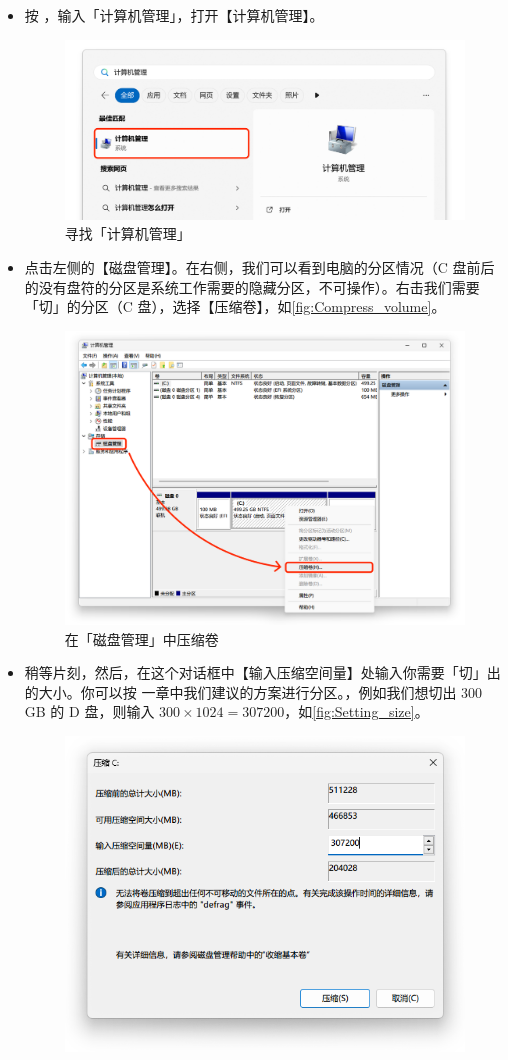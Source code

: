 \begin{itemize}
  \item 按 ，输入「计算机管理」，打开【计算机管理】。
    \begin{figure}[htb!]
      \centering
      \includegraphics[width=.65\textwidth]{assets/appendix/Computer_management.png}
      \caption{寻找「计算机管理」}
      \label{fig:Computer_management}
    \end{figure}
  \item 点击左侧的【磁盘管理】。在右侧，我们可以看到电脑的分区情况（C 盘前后的没有盘符的分区是系统工作需要的隐藏分区，不可操作）。右击我们需要「切」的分区（C 盘），选择【压缩卷】，如\autoref{fig:Compress_volume}。
    \begin{figure}[htb!]
      \centering
      \includegraphics[width=.75\textwidth]{assets/appendix/Compress_volume.png}
      \caption{在「磁盘管理」中压缩卷}
      \label{fig:Compress_volume}
    \end{figure}
  \item 稍等片刻，然后，在这个对话框中【输入压缩空间量】处输入你需要「切」出的大小。你可以按 一章中我们建议的方案进行分区。，例如我们想切出 300 GB 的 D 盘，则输入 $300\times1024=307200$，如\autoref{fig:Setting_size}。
    \begin{figure}[htb!]
      \centering
      \includegraphics[width=.5\textwidth]{assets/appendix/Setting_size.png}

\end{figure}
\end{itemize}
